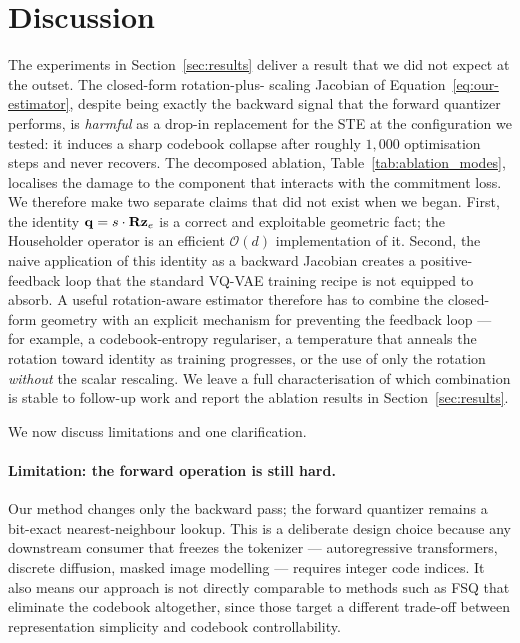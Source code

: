\section{Discussion}
\label{sec:discussion}

The experiments in Section~\ref{sec:results} deliver a result that
we did not expect at the outset. The closed-form rotation-plus-
scaling Jacobian of Equation~\eqref{eq:our-estimator}, despite being
exactly the backward signal that the forward quantizer performs, is
\emph{harmful} as a drop-in replacement for the STE at the
configuration we tested: it induces a sharp codebook collapse after
roughly $1{,}000$ optimisation steps and never recovers. The
decomposed ablation, Table~\ref{tab:ablation_modes}, localises the
damage to the component that interacts with the commitment loss. We
therefore make two separate claims that did not exist when we began.
First, the identity $\mathbf{q} = s\cdot\mathbf{R}\mathbf{z}_e$ is a correct and
exploitable geometric fact; the Householder operator is an efficient
$\mathcal{O}(d)$ implementation of it. Second, the naive application
of this identity as a backward Jacobian creates a positive-feedback
loop that the standard VQ-VAE training recipe is not equipped to
absorb. A useful rotation-aware estimator therefore has to combine
the closed-form geometry with an explicit mechanism for preventing
the feedback loop --- for example, a codebook-entropy regulariser, a
temperature that anneals the rotation toward identity as training
progresses, or the use of only the rotation \emph{without} the
scalar rescaling. We leave a full characterisation of which
combination is stable to follow-up work and report the ablation
results in Section~\ref{sec:results}.

We now discuss limitations and one clarification.

\paragraph{Limitation: the forward operation is still hard.}
Our method changes only the backward pass; the forward quantizer
remains a bit-exact nearest-neighbour lookup. This is a deliberate
design choice because any downstream consumer that freezes the
tokenizer --- autoregressive transformers, discrete diffusion, masked
image modelling --- requires integer code indices.  It also means
our approach is not directly comparable to methods such as FSQ that
eliminate the codebook altogether, since those target a different
trade-off between representation simplicity and codebook
controllability.


